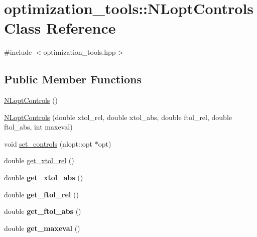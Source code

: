 \hypertarget{classoptimization__tools_1_1_n_lopt_controls}{}\section{optimization\+\_\+tools\+:\+:N\+Lopt\+Controls Class Reference}
\label{classoptimization__tools_1_1_n_lopt_controls}


{\ttfamily \#include $<$optimization\+\_\+tools.\+hpp$>$}

\subsection*{Public Member Functions}
\begin{DoxyCompactItemize}
\item 
\hyperlink{classoptimization__tools_1_1_n_lopt_controls_a79c68f622a830310faab4b7053404537}{N\+Lopt\+Controls} ()
\item 
\hyperlink{classoptimization__tools_1_1_n_lopt_controls_a32a9c83dccfd6465bbe2781461754b53}{N\+Lopt\+Controls} (double xtol\+\_\+rel, double xtol\+\_\+abs, double ftol\+\_\+rel, double ftol\+\_\+abs, int maxeval)
\item 
void \hyperlink{classoptimization__tools_1_1_n_lopt_controls_abadc98747c00b03d2ca1438a90e0f7ea}{set\+\_\+controls} (nlopt\+::opt $\ast$opt)
\end{DoxyCompactItemize}
{\bf }\par
\begin{DoxyCompactItemize}
\item 
double \hyperlink{classoptimization__tools_1_1_n_lopt_controls_a3b9ab6936b1058c3e54b06740ef3ea98}{get\+\_\+xtol\+\_\+rel} ()
\item 
double {\bfseries get\+\_\+xtol\+\_\+abs} ()\hypertarget{classoptimization__tools_1_1_n_lopt_controls_a499c5dc12d817d4bfbf9e0299d3ee59d}{}\label{classoptimization__tools_1_1_n_lopt_controls_a499c5dc12d817d4bfbf9e0299d3ee59d}

\item 
double {\bfseries get\+\_\+ftol\+\_\+rel} ()\hypertarget{classoptimization__tools_1_1_n_lopt_controls_ad969617f00cfc10828de474d8280ac2b}{}\label{classoptimization__tools_1_1_n_lopt_controls_ad969617f00cfc10828de474d8280ac2b}

\item 
double {\bfseries get\+\_\+ftol\+\_\+abs} ()\hypertarget{classoptimization__tools_1_1_n_lopt_controls_ab6a7f0d0199b9c66a79fa35f19acee04}{}\label{classoptimization__tools_1_1_n_lopt_controls_ab6a7f0d0199b9c66a79fa35f19acee04}

\item 
double {\bfseries get\+\_\+maxeval} ()\hypertarget{classoptimization__tools_1_1_n_lopt_controls_a931388e375b0001c18c839a1bc412c45}{}\label{classoptimization__tools_1_1_n_lopt_controls_a931388e375b0001c18c839a1bc412c45}

\end{DoxyCompactItemize}




